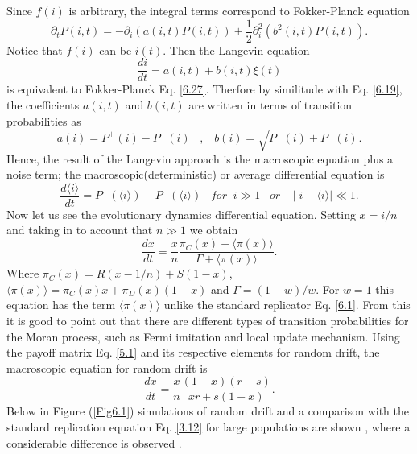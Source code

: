  Since $f(i)$ is arbitrary, the integral terms correspond to Fokker-Planck equation
 \begin{equation}\label{6.27}
 \partial_{t}P(i,t)= -\partial_{i}(a(i,t)P(i,t))+\frac{1}{2}\partial^{2}_{i}(b^2(i,t)P(i,t)).
 \end{equation}  
 Notice that $f(i)$ can be $i(t)$. Then the Langevin equation
 \begin{equation}
 \frac{di}{dt}=a(i,t) + b(i,t)\xi(t)
 \end{equation} 
 is equivalent to Fokker-Planck Eq. \eqref{6.27}. Therfore by similitude  with Eq. \eqref{6.19}, the coefficients $a(i,t)$ and $b(i,t)$ are written in terms of transition probabilities as
 \begin{equation}
 a(i)=P^{+}(i)-P^{-}(i)\;\;\; , \;\;\; b(i)=\sqrt{P^{+}(i)+P^{-}(i)}.
 \end{equation} 
Hence, the result of the Langevin approach  is the macroscopic equation plus a noise term; the macroscopic(deterministic) or average differential equation is
\begin{equation}
\frac{d\langle i\rangle}{dt}=P^{+}(\langle i\rangle)-P^{-}(\langle i\rangle)\;\;\; for\;\;i\gg1\;\;\; or \;\;\; \mid i-\langle i\rangle\mid\ll 1.
\end{equation} 
Now let us see the evolutionary dynamics differential equation. Setting $x=i/n$ and taking in to account that $n\gg 1$ we obtain
\begin{equation}
\frac{dx}{dt}=\frac{x}{n}\frac{\pi_{C}(x)-\langle\pi(x)\rangle}{\Gamma+ \langle\pi(x)\rangle}.
\end{equation}
Where $\pi_{C}(x)=R(x-1/n)+S(1-x)$,  $\langle\pi(x)\rangle=\pi_{C}(x)x +\pi_{D}(x)(1-x)$ and $\Gamma=(1-w)/w$. For $w=1$ this equation has the term $ \langle\pi(x)\rangle$ unlike the standard replicator Eq. \eqref{6.1}. From this it is good 
to point out that there are different types of transition probabilities for the Moran process, such as Fermi imitation and local update mechanism\cite{Traulsen2009}.
Using the payoff matrix Eq. \eqref{5.1} and its respective elements for random drift, the macroscopic equation for random drift is
\begin{equation}\label{6.32}
\frac{dx}{dt}=\frac{x}{n}\frac{(1-x)(r-s)}{xr+s(1-x)}.
\end{equation}
Below in Figure (\ref{Fig6.1}) simulations of random drift and a comparison with the standard replication equation Eq. \eqref{3.12} for large populations are shown , where a considerable difference is observed .  

